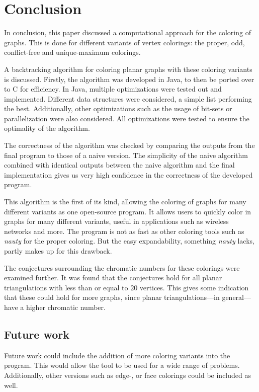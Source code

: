 \documentclass{article}
\begin{document}
\section{Conclusion}
\label{sec:conclusion}

In conclusion, this paper discussed a computational approach for the coloring of graphs. This is done for different variants of vertex colorings: the proper, odd, conflict-free and unique-maximum colorings. 

A backtracking algorithm for coloring planar graphs with these coloring variants is discussed. Firstly, the algorithm was developed in Java, to then be ported over to C for efficiency. In Java, multiple optimizations were tested out and implemented. Different data structures were considered, a simple list performing the best. Additionally, other optimizations such as the usage of bit-sets or parallelization were also considered. 
All optimizations were tested to ensure the optimality of the algorithm.

The correctness of the algorithm was checked by comparing the outputs from the final program to those of a naive version. The simplicity of the naive algorithm combined with identical outputs between the naive algorithm and the final implementation gives us very high confidence in the correctness of the developed program.


This algorithm is the first of its kind, allowing the coloring of graphs for many different variants as one open-source program. It allows users to quickly color in graphs for many different variants, useful in applications such as wireless networks and more.
The program is not as fast as other coloring tools such as \textit{nauty} for the proper coloring. But the easy expandability, something \textit{nauty} lacks, partly makes up for this drawback. 

The conjectures surrounding the chromatic numbers for these colorings were examined further. It was found that the conjectures hold for all planar triangulations with less than or equal to $20$ vertices. This gives some indication that these could hold for more graphs, since planar triangulations---in general---have a higher chromatic number. 


\subsection{Future work}

Future work could include the addition of more coloring variants into the program. This would allow the tool to be used for a wide range of problems. 
Additionally, other versions such as edge-, or face colorings could be included as well.
\end{document}
